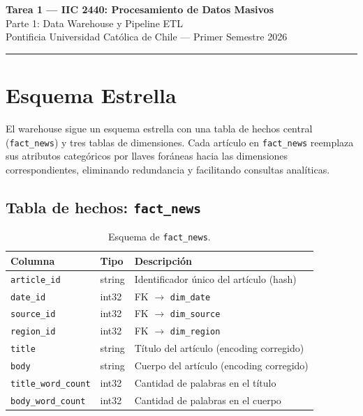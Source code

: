 \documentclass[11pt, letterpaper]{article}
\begin{document}
\begin{center}
  {\Large \textbf{Tarea 1 --- IIC 2440: Procesamiento de Datos Masivos}} \\[4pt]
  {\large Parte 1: Data Warehouse y Pipeline ETL} \\[2pt]
  {\small Pontificia Universidad Católica de Chile \quad --- \quad Primer Semestre 2026}
\end{center}

\vspace{0.5em}
\hrule
\vspace{1em}

\section{Esquema Estrella}

El warehouse sigue un esquema estrella con una tabla de hechos central
(\texttt{fact\_news}) y tres tablas de dimensiones. Cada artículo en
\texttt{fact\_news} reemplaza sus atributos categóricos por llaves foráneas
hacia las dimensiones correspondientes, eliminando redundancia y facilitando
consultas analíticas.

\subsection{Tabla de hechos: \texttt{fact\_news}}

\begin{table}[H]
\centering
\begin{tabular}{lll}
\toprule
\textbf{Columna} & \textbf{Tipo} & \textbf{Descripción} \\
\midrule
\texttt{article\_id}       & string  & Identificador único del artículo (hash) \\
\texttt{date\_id}          & int32   & FK $\to$ \texttt{dim\_date} \\
\texttt{source\_id}        & int32   & FK $\to$ \texttt{dim\_source} \\
\texttt{region\_id}        & int32   & FK $\to$ \texttt{dim\_region} \\
\texttt{title}             & string  & Título del artículo (encoding corregido) \\
\texttt{body}              & string  & Cuerpo del artículo (encoding corregido) \\
\texttt{title\_word\_count} & int32  & Cantidad de palabras en el título \\
\texttt{body\_word\_count}  & int32  & Cantidad de palabras en el cuerpo \\
\bottomrule
\end{tabular}
\caption{Esquema de \texttt{fact\_news}.}
\end{table}
\end{document}
